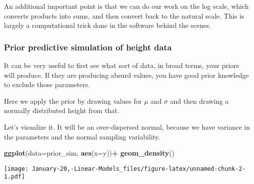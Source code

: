 \documentclass[]{article}
\newenvironment{Shaded}{\begin{snugshade}}{\end{snugshade}}
\newcommand{\DataTypeTok}[1]{\textcolor[rgb]{0.13,0.29,0.53}{#1}}
\newcommand{\DecValTok}[1]{\textcolor[rgb]{0.00,0.00,0.81}{#1}}
\newcommand{\FloatTok}[1]{\textcolor[rgb]{0.00,0.00,0.81}{#1}}
\newcommand{\KeywordTok}[1]{\textcolor[rgb]{0.13,0.29,0.53}{\textbf{#1}}}
\newcommand{\NormalTok}[1]{#1}
\newcommand{\OperatorTok}[1]{\textcolor[rgb]{0.81,0.36,0.00}{\textbf{#1}}}
\newcommand{\StringTok}[1]{\textcolor[rgb]{0.31,0.60,0.02}{#1}}
\begin{document}
An additional important point is that we can do our work on the log
scale, which converts products into sums, and then convert back to the
natural scale. This is largely a computational trick done in the
software behind the scenes.

\hypertarget{prior-predictive-simulation-of-height-data}{%
\subsubsection{Prior predictive simulation of height
data}\label{prior-predictive-simulation-of-height-data}}

It can be very useful to first see what sort of data, in broad terms,
your priors will produce. If they are producing absurd values, you have
good prior knowledge to exclude those parameters.

Here we apply the prior by drawing values for \(\mu\) and \(\sigma\) and
then drawing a normally distributed height from that.

\begin{Shaded}
\end{Shaded}

Let's visualize it. It will be an over-dispersed normal, because we have
variance in the parameters and the normal sampling variability.

\begin{Shaded}
\begin{Highlighting}[]
\KeywordTok{ggplot}\NormalTok{(}\DataTypeTok{data=}\NormalTok{prior_sim, }\KeywordTok{aes}\NormalTok{(}\DataTypeTok{x=}\NormalTok{y))}\OperatorTok{+}\StringTok{ }\KeywordTok{geom_density}\NormalTok{()}
\end{Highlighting}
\end{Shaded}

\texttt{[image: January-20,-Linear-Models\_files/figure-latex/unnamed-chunk-2-1.pdf]}
\end{document}
